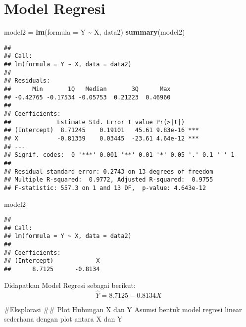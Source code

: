\documentclass[
]{article}
\newenvironment{Shaded}{\begin{snugshade}}{\end{snugshade}}
\newcommand{\AttributeTok}[1]{\textcolor[rgb]{0.13,0.29,0.53}{#1}}
\newcommand{\FunctionTok}[1]{\textcolor[rgb]{0.13,0.29,0.53}{\textbf{#1}}}
\newcommand{\NormalTok}[1]{#1}
\newcommand{\OtherTok}[1]{\textcolor[rgb]{0.56,0.35,0.01}{#1}}
\newcommand{\SpecialCharTok}[1]{\textcolor[rgb]{0.81,0.36,0.00}{\textbf{#1}}}
\begin{document}
\hypertarget{model-regresi-1}{%
\section{Model Regresi}\label{model-regresi-1}}

\begin{Shaded}
\begin{Highlighting}[]
\NormalTok{model2 }\OtherTok{=} \FunctionTok{lm}\NormalTok{(}\AttributeTok{formula =}\NormalTok{ Y }\SpecialCharTok{\textasciitilde{}}\NormalTok{ X, data2)}
\FunctionTok{summary}\NormalTok{(model2)}
\end{Highlighting}
\end{Shaded}

\begin{verbatim}
## 
## Call:
## lm(formula = Y ~ X, data = data2)
## 
## Residuals:
##      Min       1Q   Median       3Q      Max 
## -0.42765 -0.17534 -0.05753  0.21223  0.46960 
## 
## Coefficients:
##             Estimate Std. Error t value Pr(>|t|)    
## (Intercept)  8.71245    0.19101   45.61 9.83e-16 ***
## X           -0.81339    0.03445  -23.61 4.64e-12 ***
## ---
## Signif. codes:  0 '***' 0.001 '**' 0.01 '*' 0.05 '.' 0.1 ' ' 1
## 
## Residual standard error: 0.2743 on 13 degrees of freedom
## Multiple R-squared:  0.9772, Adjusted R-squared:  0.9755 
## F-statistic: 557.3 on 1 and 13 DF,  p-value: 4.643e-12
\end{verbatim}

\begin{Shaded}
\begin{Highlighting}[]
\NormalTok{model2}
\end{Highlighting}
\end{Shaded}

\begin{verbatim}
## 
## Call:
## lm(formula = Y ~ X, data = data2)
## 
## Coefficients:
## (Intercept)            X  
##      8.7125      -0.8134
\end{verbatim}

Didapatkan Model Regresi sebagai berikut: \[\hat Y = 8.7125-0.8134X\]

\#Eksplorasi \#\# Plot Hubungan X dan Y Asumsi bentuk model regresi
linear sederhana dengan plot antara X dan Y

\begin{Shaded}
\end{Shaded}
\end{document}
